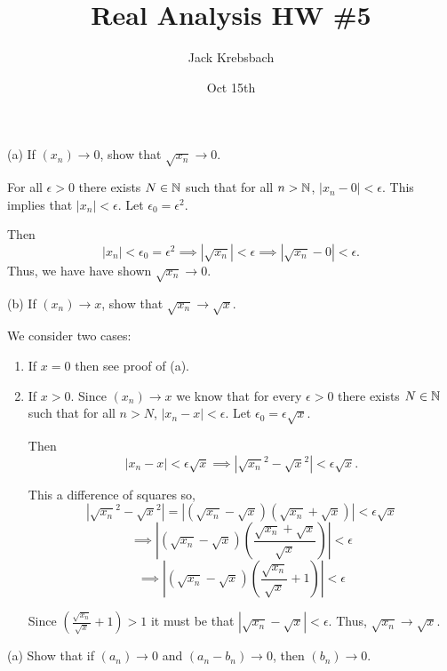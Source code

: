\documentclass{report}
\title{Real Analysis HW \#5}
\author{Jack Krebsbach }
\date{Oct 15th}
\begin{document}
\maketitle
{}

\bigskip
(a) If $\left(x_n\right) \rightarrow 0$, show that $\sqrt{x_n} \rightarrow 0$.

\begin{myproof}
\bigskip
For all $\epsilon >0$ there exists $N \in \NN$ such that for all $n> \NN$, $|x_n - 0| < \epsilon.$
This implies that $|x_n| < \epsilon.$ Let $\epsilon_0 = \epsilon^2.$

Then $$|x_n| < \epsilon_0 = \epsilon^2 \implies |\sqrt{x_n}| < \epsilon  \implies  |\sqrt{x_n} - 0| < \epsilon.$$ Thus, we have have shown $\sqrt{x_n} \rightarrow 0.$
\end{myproof}

\bigskip
(b) If $\left(x_n\right) \rightarrow x$, show that $\sqrt{x_n} \rightarrow \sqrt{x}$.


\bigskip
\begin{myproof}
We consider two cases: 
\begin{enumerate}
  \item If $x = 0$ then see proof of (a).
  \item If $x > 0.$  Since $(x_n) \rightarrow x$ we know that for every $\epsilon >0 $ there exists $N \in \NN$ such that for all $n > N$, $|x_n -x | < \epsilon.$ Let $\epsilon_0 = \epsilon \sqrt{x}.$

    Then $$\left|x_n -x  \right| < \epsilon \sqrt{x} \implies \left| \sqrt{x_n}^2 - \sqrt{x}^2  \right| < \epsilon \sqrt{x}.$$

This a difference of squares so, $$\left| \sqrt{x_n}^2 - \sqrt{x}^2  \right| = \left| (\sqrt{x_n} - \sqrt{x})(\sqrt{x_n} + \sqrt{x})  \right| < \epsilon \sqrt{x}$$
$$ \implies\left| (\sqrt{x_n} - \sqrt{x}) \left(\frac{\sqrt{x_n} + \sqrt{x}}{\sqrt{x}}\right)\right| < \epsilon$$
$$ \implies\left| (\sqrt{x_n} - \sqrt{x}) \left(\frac{\sqrt{x_n}}{\sqrt{x}} + 1 \right)\right| < \epsilon$$

Since $\left(\frac{\sqrt{x_n}}{\sqrt{x}} + 1\right) > 1$ it must be that  $\left|\sqrt{x_n} - \sqrt{x}\right| < \epsilon.$ Thus, $\sqrt{x_n} \rightarrow \sqrt{x}.$
\end{enumerate}
\end{myproof}

(a) Show that if $\left(a_n\right) \rightarrow 0$ and $\left(a_n-b_n\right) \rightarrow 0$, then $\left(b_n\right) \rightarrow 0$.
\end{document}
